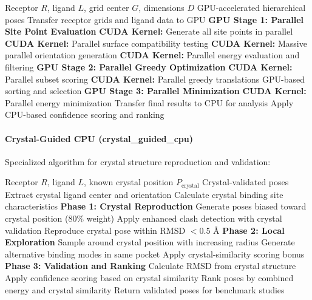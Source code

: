 \documentclass[11pt,a4paper]{article}
\begin{document}
\begin{algorithm}[H]
\caption{Enhanced Hierarchical GPU Docking}
\begin{algorithmic}[1]
\Require Receptor $R$, ligand $L$, grid center $G$, dimensions $D$
\Ensure GPU-accelerated hierarchical poses
\State Transfer receptor grids and ligand data to GPU
\State \textbf{GPU Stage 1: Parallel Site Point Evaluation}
\State \textbf{CUDA Kernel:} Generate all site points in parallel
\State \textbf{CUDA Kernel:} Parallel surface compatibility testing
\State \textbf{CUDA Kernel:} Massive parallel orientation generation
\State \textbf{CUDA Kernel:} Parallel energy evaluation and filtering
\State \textbf{GPU Stage 2: Parallel Greedy Optimization}
\State \textbf{CUDA Kernel:} Parallel subset scoring
\State \textbf{CUDA Kernel:} Parallel greedy translations
\State GPU-based sorting and selection
\State \textbf{GPU Stage 3: Parallel Minimization}
\State \textbf{CUDA Kernel:} Parallel energy minimization
\State Transfer final results to CPU for analysis
\State Apply CPU-based confidence scoring and ranking
\end{algorithmic}
\end{algorithm}

\paragraph{Crystal-Guided CPU (crystal\_guided\_cpu)}

Specialized algorithm for crystal structure reproduction and validation:

\begin{algorithm}[H]
\caption{Crystal-Guided CPU Docking}
\begin{algorithmic}[1]
\Require Receptor $R$, ligand $L$, known crystal position $P_{\text{crystal}}$
\Ensure Crystal-validated poses
\State Extract crystal ligand center and orientation
\State Calculate crystal binding site characteristics
\State \textbf{Phase 1: Crystal Reproduction}
\State Generate poses biased toward crystal position (80\% weight)
\State Apply enhanced clash detection with crystal validation
\State Reproduce crystal pose within RMSD $< 0.5$ Å
\State \textbf{Phase 2: Local Exploration}
\State Sample around crystal position with increasing radius
\State Generate alternative binding modes in same pocket
\State Apply crystal-similarity scoring bonus
\State \textbf{Phase 3: Validation and Ranking}
\State Calculate RMSD from crystal structure
\State Apply confidence scoring based on crystal similarity
\State Rank poses by combined energy and crystal similarity
\State Return validated poses for benchmark studies
\end{algorithmic}
\end{algorithm}
\end{document}
